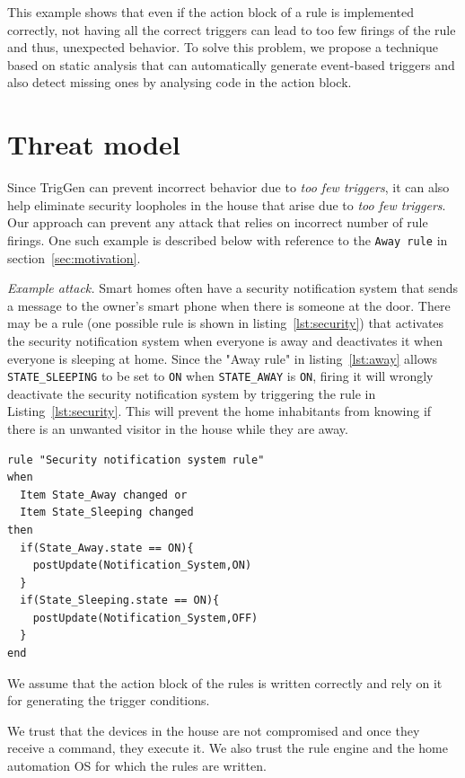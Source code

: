 \documentclass{sig-alternate-05-2015}
\begin{document}
This example shows that even if the action block of a rule is implemented correctly, not having all the correct triggers can lead to too few firings of the rule and thus, unexpected behavior. To solve this problem, we propose a technique based on static analysis that can automatically generate event-based triggers and also detect missing ones by analysing code in the action block. 

\section{Threat model}
Since TrigGen can prevent incorrect behavior due to \textit{too few triggers}, it can also help eliminate security loopholes in the house that arise due to \textit{too few triggers}. Our approach can prevent any attack that relies on incorrect number of rule firings. One such example is described below with reference to the \texttt{Away rule} in section~\ref{sec:motivation}.

\textit{Example attack.} Smart homes often have a security notification system that sends a message to the owner's smart phone when there is someone at the door. There may be a rule (one possible rule is shown in listing~\ref{lst:security}) that activates the security notification system when everyone is away and deactivates it when everyone is sleeping at home. Since the "Away rule" in listing~\ref{lst:away} allows \texttt{STATE\_SLEEPING} to be set to \texttt{ON}  
when \texttt{STATE\_AWAY} is \texttt{ON}, firing it will wrongly deactivate the security notification system by triggering the rule in Listing~\ref{lst:security}. This will prevent the home inhabitants from knowing if there is an unwanted visitor in the house while they are away.
\begin{lstlisting}[caption={Rule for activating the security notification system in the house.},label={lst:security}]
rule "Security notification system rule"
when
  Item State_Away changed or
  Item State_Sleeping changed	
then
  if(State_Away.state == ON){
    postUpdate(Notification_System,ON)
  }
  if(State_Sleeping.state == ON){
    postUpdate(Notification_System,OFF)
  }
end
\end{lstlisting}

We assume that the action block of the rules is written correctly and rely on it for generating the trigger conditions.

We trust that the devices in the house are not compromised and once they receive a command, they execute it. We also trust the rule engine and the home automation OS for which the rules are written.
\end{document}
